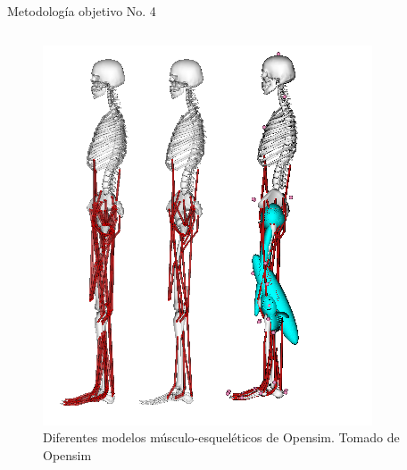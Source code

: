 \documentclass[10pt]{beamer}
\begin{document}
\begin{frame}{Metodología objetivo No. 4}
\begin{columns}[t]
\column{60 mm}

\begin{figure}
\begin{centering}
\includegraphics[scale=0.4]{Feathergraphics/2354_2392_SIMM}
\par\end{centering}
\caption{Diferentes modelos músculo-esqueléticos de Opensim. Tomado de Opensim}
\end{figure}

\end{columns}

\end{frame}
\end{document}
